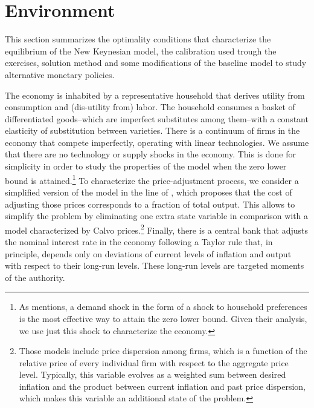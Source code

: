 \documentclass[11pt]{article}
\numberwithin{equation}{section}
\begin{document}
\section{Environment}\label{sec:model}

This section summarizes the optimality conditions that characterize the equilibrium of the New Keynesian model, the calibration used trough the exercises, solution method and some modifications of the baseline model to study alternative monetary policies. 

The economy is inhabited by a representative household that derives utility from consumption and (dis-utility from) labor. The household consumes a basket of differentiated goods--which are imperfect substitutes among them--with a constant elasticity of substitution between varieties. There is a continuum of firms in the economy that compete imperfectly, operating with linear technologies. We assume that there are no technology or supply shocks in the economy. This is done for simplicity in order to study the properties of the model when the zero lower bound is attained.\footnote{As \cite{Fernandez-VillaverdeEtAl2015} mentions, a demand shock in the form of a shock to household preferences is the most effective way to attain the zero lower bound. Given their analysis, we use just this shock to characterize the economy.} To characterize the price-adjustment process, we consider a simplified version of the model in the line of \cite{Rotemberg1982}, which proposes that the cost of adjusting those prices corresponds to a fraction of total output. This allows to simplify the problem by eliminating one extra state variable in comparison with a model characterized by Calvo prices.\footnote{Those models include price dispersion among firms, which is a function of the relative price of every individual firm with respect to the aggregate price level. Typically, this variable evolves as a weighted sum between desired inflation and the product between current inflation and past price dispersion, which makes this variable an additional state of the problem.} Finally, there is a central bank that adjusts the nominal interest rate in the economy following a Taylor rule that, in principle, depends only on deviations of current levels of inflation and output with respect to their long-run levels. These long-run levels are targeted moments of the authority. 
\end{document}
